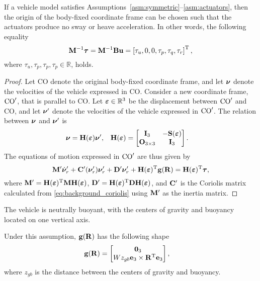 \begin{prop}
    \label{prop:neutral_point}
    If a vehicle model satisfies Assumptions~\ref{asm:symmetric}--\ref{asm:actuators}, then the origin of the body-fixed coordinate frame can be chosen such that the actuators produce no sway or heave acceleration.
    In other words, the following equality
    \begin{equation}
        \mathbf{M}^{-1}\bm{\tau} = \mathbf{M}^{-1}\mathbf{B}\mathbf{u} = \left[\tau_u, 0, 0, \tau_p, \tau_q, \tau_r\right]^{\mathrm{T}},
    \end{equation}
    where $\tau_u, \tau_p, \tau_p, \tau_p \in \mathbb{R}$, holds.
\end{prop}
\begin{proof}
    Let CO denote the original body-fixed coordinate frame, and let $\bm{\nu}$ denote the velocities of the vehicle expressed in CO.
    Consider a new coordinate frame, ${\rm CO}^{\prime}$, that is parallel to CO.
    Let $\bm{\varepsilon} \in \mathbb{R}^3$ be the displacement between ${\rm CO}^{\prime}$ and CO, and let $\bm{\nu}^{\prime}$ denote the velocities of the vehicle expressed in ${\rm CO}^{\prime}$.
    The relation between $\bm{\nu}$ and $\bm{\nu}^{\prime}$ is
    \begin{align}
        \bm{\nu} &= \mathbf{H}(\bm{\varepsilon}) \bm{\nu}^{\prime}, &
        \mathbf{H}(\bm{\varepsilon}) &=
        \begin{bmatrix}
            \mathbf{I}_3 & -\mathbf{S}(\bm{\varepsilon}) \\
            \mathbf{O}_{3 \times 3} & \mathbf{I}_3
        \end{bmatrix}.
    \end{align}
    The equations of motion expressed in ${\rm CO}^{\prime}$ are thus given by
    \begin{equation}
        \mathbf{M}^{\prime}\dot{\bm{\nu}}_r^{\prime} + \mathbf{C}^{\prime}(\bm{\nu}^{\prime}_r)\bm{\nu}^{\prime}_r + \mathbf{D}^{\prime}\bm{\nu}^{\prime}_r + \mathbf{H}(\bm{\varepsilon})^{\mathrm{T}}\mathbf{g}(\mathbf{R}) = \mathbf{H}(\bm{\varepsilon})^{\mathrm{T}}\bm{\tau},
    \end{equation}
    where $\mathbf{M}^{\prime} = \mathbf{H}(\bm{\varepsilon})^{\mathrm{T}} \mathbf{M} \mathbf{H}(\bm{\varepsilon})$, $\mathbf{D}^{\prime} = \mathbf{H}(\bm{\varepsilon})^{\mathrm{T}} \mathbf{D} \mathbf{H}(\bm{\varepsilon})$, and $\mathbf{C}^{\prime}$ is the Coriolis matrix calculated from \eqref{eq:background_coriolis} using $\mathbf{M}^{\prime}$ as the inertia matrix.


\end{proof}

\begin{asm}
    \label{asm:buoyancy}
    The vehicle is neutrally buoyant, with the centers of gravity and buoyancy located on one vertical axis.
\end{asm}
\noindent Under this assumption, $\mathbf{g}(\mathbf{R})$ has the following shape
\begin{align}
    \mathbf{g}(\mathbf{R}) &= \begin{bmatrix}
        \mathbf{0}_3 \\ Wz_{gb} \mathbf{e}_3 \times \mathbf{R}^{\mathrm{T}} \mathbf{e}_3
    \end{bmatrix},
    \label{eq:gravity}
\end{align}
where $z_{gb}$ is the distance between the centers of gravity and buoyancy.
